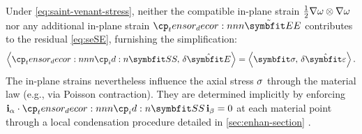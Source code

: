 Under \eqref{eq:saint-venant-stress}, neither the compatible in-plane strain 
\(\tfrac{1}{2}\nabla\omega\otimes\nabla\omega\) nor any additional 
in-plane strain \(\PlaneStrainTensor\) contributes to the residual \eqref{eq:seSE}, furnishing the simplification:
\begin{equation}
\left<\StressTensor,\,\delta\hat{\bm{E}}\right>
=\left<\StressVector,\,\delta\hat{\bm{\varepsilon}}\right>.
\label{eq:sv-vw-reduction}
\end{equation}
The in-plane strains nevertheless influence the axial stress \(\sigma\) 
through the material law (e.g., via Poisson contraction). 
They are determined implicitly by enforcing \(\FrameBasis_{\alpha}\cdot\StressTensor\,\FrameBasis_{\beta}=0\) 
at each material point through a local condensation procedure detailed 
in \cref{sec:enhan-section} \citep{klinkel2002using}.

